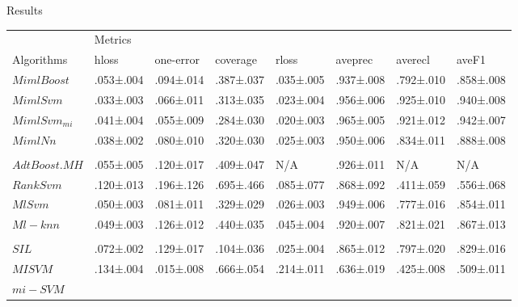 \begin{frame}{Results}
\begin{tiny}
	\begin{table}[]
\centering
\begin{tabular}{llllllll}
\hline
 & \multicolumn{7}{l}{Metrics} \\ \cline{2-8} 
Algorithms & hloss & one-error & coverage & rloss & aveprec & averecl & aveF1 \\ \hline
$MimlBoost$ & .053±.004 & .094±.014 & .387±.037 & .035±.005 & .937±.008 & .792±.010 & .858±.008 \\
$MimlSvm$ & .033±.003 & .066±.011 & .313±.035 & .023±.004 & .956±.006 & .925±.010 & .940±.008 \\
$MimlSvm_{mi}$ & .041±.004 & .055±.009 & .284±.030 & .020±.003 & .965±.005 & .921±.012 & .942±.007 \\
$MimlNn$ & .038±.002 & .080±.010 & .320±.030 & .025±.003 & .950±.006 & .834±.011 & .888±.008 \\
 &  &  &  &  &  &  &  \\
$AdtBoost.MH$ &  .055±.005 & .120±.017 & .409±.047 & N/A & .926±.011 & N/A & N/A\\
$RankSvm$ & .120±.013 & .196±.126 & .695±.466 & .085±.077 & .868±.092 & .411±.059 & .556±.068 \\
$MlSvm$ & .050±.003 & .081±.011 & .329±.029 & .026±.003 & .949±.006 & .777±.016 & .854±.011\\
$Ml-knn$ & .049±.003 & .126±.012 & .440±.035 & .045±.004 & .920±.007 & .821±.021 & .867±.013 \\
 &  &  &  &  &  &  &  \\
$SIL$ & .072±.002 & .129±.017 & .104±.036 & .025±.004 & .865±.012 & .797±.020 & .829±.016 \\
$MISVM$ & .134±.004 & .015±.008 & .666±.054 & .214±.011 & .636±.019 & .425±.008 & .509±.011 \\
$mi-SVM$ &  &  &  &  &  &  &  \\ \hline
\end{tabular}
\end{table}
\end{tiny}
\end{frame}

